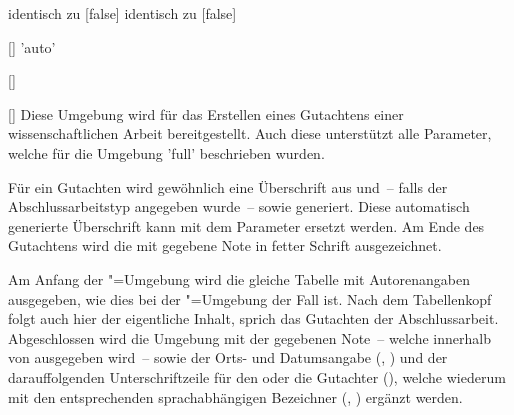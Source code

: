 \documentclass[english,ngerman]{tudscrman3}
\begin{document}
  identisch zu [false]%
  identisch zu [false]%
  
  

\begin{Declaration}{[]}{%
  'auto'%
}
\begin{Declaration}{%
  []%
}
\begin{Declaration}{[]}
\printdeclarationlist%
%
%
Diese Umgebung wird für das Erstellen eines Gutachtens einer 
wissenschaftlichen 
Arbeit bereitgestellt. Auch diese unterstützt alle Parameter, welche für die 
Umgebung 'full' beschrieben wurden.

Für ein Gutachten wird gewöhnlich eine Überschrift aus  
und~-- falls der Abschlussarbeitstyp angegeben wurde~--  
sowie  generiert. Diese automatisch generierte Überschrift kann 
mit dem Parameter  ersetzt werden. Am 
Ende des Gutachtens wird die mit  
gegebene Note in fetter Schrift ausgezeichnet.

Am Anfang der "=Umgebung wird die gleiche Tabelle mit 
Autorenangaben ausgegeben, wie dies bei der "=Umgebung der 
Fall ist. Nach dem Tabellenkopf folgt auch hier der eigentliche Inhalt, sprich 
das Gutachten der Abschlussarbeit. Abgeschlossen wird die Umgebung mit der 
gegebenen Note~-- welche innerhalb von  ausgegeben wird~-- 
sowie der Orts- und Datumsangabe (, ) und der 
darauffolgenden Unterschriftzeile für den oder die Gutachter 
(), 
welche wiederum mit den entsprechenden sprachabhängigen Bezeichner 
(, ) ergänzt werden.
\end{Declaration}
\end{Declaration}
\end{Declaration}
\end{document}
